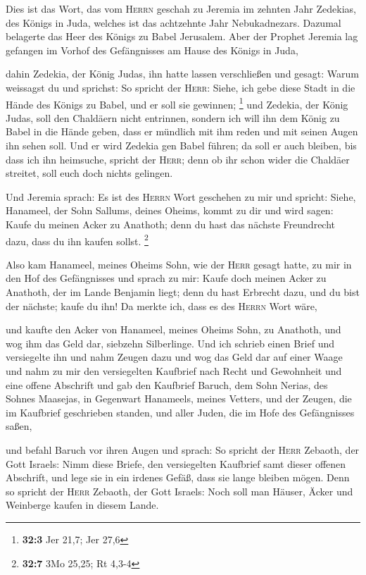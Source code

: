  Dies ist das Wort, das vom \textsc{Herrn} geschah zu
Jeremia im zehnten Jahr Zedekias, des Königs in Juda, welches ist das
achtzehnte Jahr Nebukadnezars.  Dazumal belagerte das Heer
des Königs zu Babel Jerusalem. Aber der Prophet Jeremia lag gefangen im
Vorhof des Gefängnisses am Hause des Königs in Juda,

 dahin Zedekia, der König Judas, ihn hatte lassen
verschließen und gesagt: Warum weissagst du und sprichst: So spricht der
\textsc{Herr}: Siehe, ich gebe diese Stadt in die Hände des Königs zu
Babel, und er soll sie gewinnen; \footnote{\textbf{32:3} Jer 21,7; Jer
  27,6}  und Zedekia, der König Judas, soll den Chaldäern
nicht entrinnen, sondern ich will ihn dem König zu Babel in die Hände
geben, dass er mündlich mit ihm reden und mit seinen Augen ihn sehen
soll.  Und er wird Zedekia gen Babel führen; da soll er
auch bleiben, bis dass ich ihn heimsuche, spricht der \textsc{Herr};
denn ob ihr schon wider die Chaldäer streitet, soll euch doch nichts
gelingen.

 Und Jeremia sprach: Es ist des \textsc{Herrn} Wort
geschehen zu mir und spricht:  Siehe, Hanameel, der Sohn
Sallums, deines Oheims, kommt zu dir und wird sagen: Kaufe du meinen
Acker zu Anathoth; denn du hast das nächste Freundrecht dazu, dass du
ihn kaufen sollst. \footnote{\textbf{32:7} 3Mo 25,25; Rt 4,3-4}

 Also kam Hanameel, meines Oheims Sohn, wie der
\textsc{Herr} gesagt hatte, zu mir in den Hof des Gefängnisses und
sprach zu mir: Kaufe doch meinen Acker zu Anathoth, der im Lande
Benjamin liegt; denn du hast Erbrecht dazu, und du bist der nächste;
kaufe du ihn! Da merkte ich, dass es des \textsc{Herrn} Wort wäre,

 und kaufte den Acker von Hanameel, meines Oheims Sohn, zu
Anathoth, und wog ihm das Geld dar, siebzehn Silberlinge.
 Und ich schrieb einen Brief und versiegelte ihn und nahm
Zeugen dazu und wog das Geld dar auf einer Waage  und
nahm zu mir den versiegelten Kaufbrief nach Recht und Gewohnheit und
eine offene Abschrift  und gab den Kaufbrief Baruch, dem
Sohn Nerias, des Sohnes Maasejas, in Gegenwart Hanameels, meines
Vetters, und der Zeugen, die im Kaufbrief geschrieben standen, und aller
Juden, die im Hofe des Gefängnisses saßen,

 und befahl Baruch vor ihren Augen und sprach:
 So spricht der \textsc{Herr} Zebaoth, der Gott Israels:
Nimm diese Briefe, den versiegelten Kaufbrief samt dieser offenen
Abschrift, und lege sie in ein irdenes Gefäß, dass sie lange bleiben
mögen.  Denn so spricht der \textsc{Herr} Zebaoth, der
Gott Israels: Noch soll man Häuser, Äcker und Weinberge kaufen in diesem
Lande.

